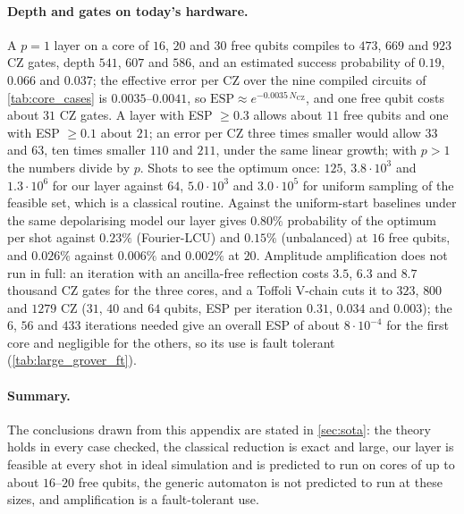 \paragraph{Depth and gates on today's hardware.} A $p=1$ layer on a core of $16$, $20$ and $30$ free qubits compiles to $473$, $669$ and $923$ CZ gates, depth $541$, $607$ and $586$, and an estimated success probability of $0.19$, $0.066$ and $0.037$; the effective error per CZ over the nine compiled circuits of \cref{tab:core_cases} is $0.0035$--$0.0041$, so $\mathrm{ESP}\approx e^{-0.0035\,N_\mathrm{CZ}}$, and one free qubit costs about $31$ CZ gates. A layer with ESP $\ge0.3$ allows about $11$ free qubits and one with ESP $\ge0.1$ about $21$; an error per CZ three times smaller would allow $33$ and $63$, ten times smaller $110$ and $211$, under the same linear growth; with $p>1$ the numbers divide by $p$. Shots to see the optimum once: $125$, $3.8\cdot10^{3}$ and $1.3\cdot10^{6}$ for our layer against $64$, $5.0\cdot10^{3}$ and $3.0\cdot10^{5}$ for uniform sampling of the feasible set, which is a classical routine. Against the uniform-start baselines under the same depolarising model our layer gives $0.80\%$ probability of the optimum per shot against $0.23\%$ (Fourier-LCU) and $0.15\%$ (unbalanced) at $16$ free qubits, and $0.026\%$ against $0.006\%$ and $0.002\%$ at $20$. Amplitude amplification does not run in full: an iteration with an ancilla-free reflection costs $3.5$, $6.3$ and $8.7$ thousand CZ gates for the three cores, and a Toffoli V-chain cuts it to $323$, $800$ and $1279$ CZ ($31$, $40$ and $64$ qubits, ESP per iteration $0.31$, $0.034$ and $0.003$); the $6$, $56$ and $433$ iterations needed give an overall ESP of about $8\cdot10^{-4}$ for the first core and negligible for the others, so its use is fault tolerant (\cref{tab:large_grover_ft}).
\paragraph{Summary.} The conclusions drawn from this appendix are stated in \cref{sec:sota}: the theory holds in every case checked, the classical reduction is exact and large, our layer is feasible at every shot in ideal simulation and is predicted to run on cores of up to about $16$--$20$ free qubits, the generic automaton is not predicted to run at these sizes, and amplification is a fault-tolerant use.

